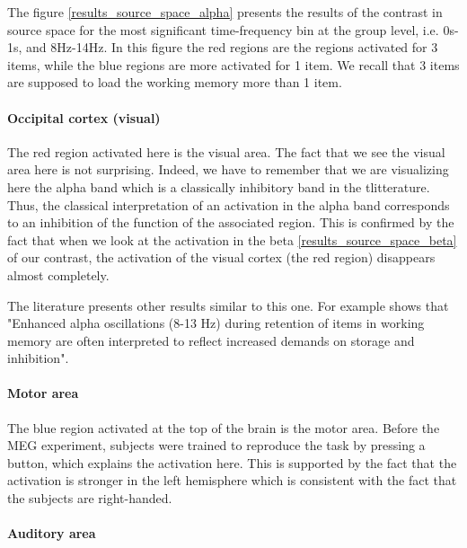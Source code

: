 The figure \ref{results_source_space_alpha} presents the results of the contrast in source space for the most significant time-frequency bin at the group level, i.e. 0s-1s, and 8Hz-14Hz. In this figure the red regions are the regions activated for 3 items, while the blue regions are more activated for 1 item. We recall that 3 items are supposed to load the working memory more than 1 item.

\paragraph{Occipital cortex (visual)}
\label{section:alpha_discussion}
The red region activated here is the visual area. The fact that we see the visual area here is not surprising. Indeed, we have to remember that we are visualizing here the alpha band which is a classically inhibitory band in the tlitterature. Thus, the classical interpretation of an activation in the alpha band corresponds to an inhibition of the function of the associated region. This is confirmed by the fact that when we look at the activation in the beta \ref{results_source_space_beta} of our contrast, the activation of the visual cortex (the red region) disappears almost completely.

The literature presents other results similar to this one. For example \cite{obleser2012adverse} shows that "Enhanced alpha oscillations (8-13 Hz) during retention of items in working memory are often interpreted to reflect increased demands on storage and inhibition".

\paragraph{Motor area}

The blue region activated at the top of the brain is the motor area. Before the MEG experiment, subjects were trained to reproduce the task by pressing a button, which explains the activation here. This is supported by the fact that the activation is stronger in the left hemisphere which is consistent with the fact that the subjects are right-handed.

\paragraph{Auditory area}

